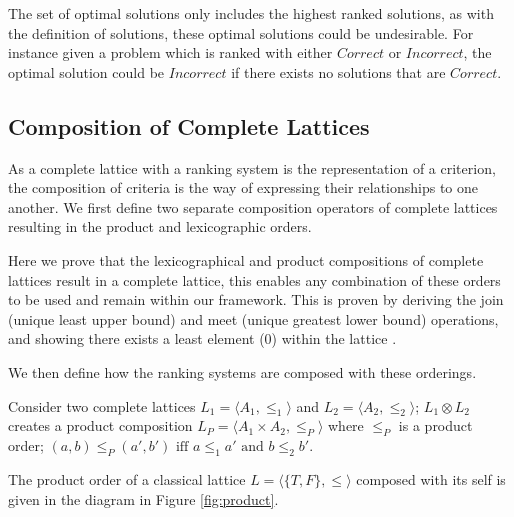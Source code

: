 The set of optimal solutions only includes the highest ranked solutions,
as with the definition of solutions, these optimal solutions could be undesirable.
For instance given a problem which is ranked with either $Correct$ or $Incorrect$, 
the optimal solution could be $Incorrect$ if there exists no solutions that are $Correct$. 

\subsection{Composition of Complete Lattices}
\label{sec:composition}
As a complete lattice with a ranking system is the representation of a criterion,
the composition of criteria is the way of expressing their relationships to one another. 
We first define two separate composition operators of complete lattices resulting in the product and lexicographic orders.

Here we prove that the lexicographical and product compositions of complete lattices result in a complete lattice,
this enables any combination of these orders to be used and remain within our framework.
This is proven by deriving the join (unique least upper bound) and meet (unique greatest lower bound) operations,
and showing there exists a least element ($0$) within the lattice \cite{davey1990introduction}. 

We then define how the ranking systems are composed with these orderings.

\begin{defs}
\label{def:product_order}
Consider two complete lattices $L_1 = \langle A_1, \leq_1 \rangle$ and $L_2 = \langle A_2, \leq_2 \rangle$;
$L_1 \otimes L_2$ creates a product composition $L_P = \langle A_1 \times A_2, \leq_P \rangle$
where $\leq_P$ is a product order; 
$(a,b) \leq_{P} (a',b') \mbox{ iff } a \leq_{1} a' \mbox{ and } b \leq_{2} b'$.
\end{defs}

The product order of a classical lattice $L = \langle \{T,F\}, \leq \rangle$ 
composed with its self is given in the diagram in Figure \ref{fig:product}.

